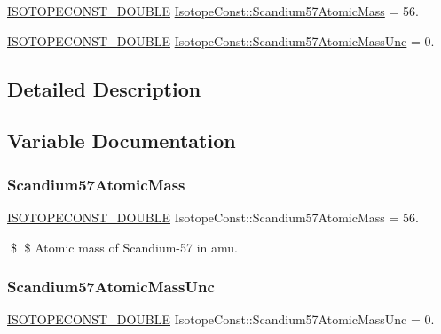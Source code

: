 \begin{DoxyCompactItemize}
\item 
\mbox{\hyperlink{group___isotope_const-_macros_ga8f45a7272ce02c0b4c65c44636ed719a}{I\+S\+O\+T\+O\+P\+E\+C\+O\+N\+S\+T\+\_\+\+D\+O\+U\+B\+LE}} \mbox{\hyperlink{group___isotope_const-_scandium-_sc57_ga2977c20ab6f249340fa0de1b0cc6e25e}{Isotope\+Const\+::\+Scandium57\+Atomic\+Mass}} = 56.
\item 
\mbox{\hyperlink{group___isotope_const-_macros_ga8f45a7272ce02c0b4c65c44636ed719a}{I\+S\+O\+T\+O\+P\+E\+C\+O\+N\+S\+T\+\_\+\+D\+O\+U\+B\+LE}} \mbox{\hyperlink{group___isotope_const-_scandium-_sc57_ga99e05a3a04627de4f9f2b904f2e4e2c0}{Isotope\+Const\+::\+Scandium57\+Atomic\+Mass\+Unc}} = 0.
\end{DoxyCompactItemize}


\subsection{Detailed Description}


\subsection{Variable Documentation}
\mbox{\label{group___isotope_const-_scandium-_sc57_ga2977c20ab6f249340fa0de1b0cc6e25e}} 
\subsubsection{\texorpdfstring{Scandium57\+Atomic\+Mass}{Scandium57AtomicMass}}
{\footnotesize\ttfamily \mbox{\hyperlink{group___isotope_const-_macros_ga8f45a7272ce02c0b4c65c44636ed719a}{I\+S\+O\+T\+O\+P\+E\+C\+O\+N\+S\+T\+\_\+\+D\+O\+U\+B\+LE}} Isotope\+Const\+::\+Scandium57\+Atomic\+Mass = 56.}

\$ \$ Atomic mass of Scandium-\/57 in amu. \mbox{\label{group___isotope_const-_scandium-_sc57_ga99e05a3a04627de4f9f2b904f2e4e2c0}} 
\subsubsection{\texorpdfstring{Scandium57\+Atomic\+Mass\+Unc}{Scandium57AtomicMassUnc}}
{\footnotesize\ttfamily \mbox{\hyperlink{group___isotope_const-_macros_ga8f45a7272ce02c0b4c65c44636ed719a}{I\+S\+O\+T\+O\+P\+E\+C\+O\+N\+S\+T\+\_\+\+D\+O\+U\+B\+LE}} Isotope\+Const\+::\+Scandium57\+Atomic\+Mass\+Unc = 0.}

